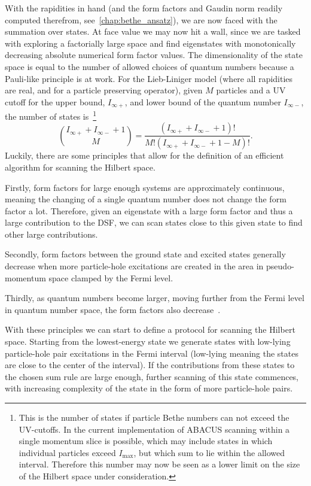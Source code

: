 \documentclass[11pt, a4paper]{report} %
\begin{document}
With the rapidities in hand (and the form factors and Gaudin norm readily computed therefrom, see~\cref{chap:bethe_ansatz}), we are now faced with the summation over states.
At face value we may now hit a wall, since we are tasked with exploring a factorially large space and find eigenstates with monotonically decreasing absolute numerical form factor values.
The dimensionality of the state space is equal to the number of allowed choices of quantum numbers because a Pauli-like principle is at work.
For the Lieb-Liniger model (where all rapidities are real, and for a particle preserving operator), given $M$ particles and a UV cutoff for the upper bound, $I_{\infty+}$, and lower bound of the quantum number $I_{\infty-}$, the number of states is~\cite{Caux2009}\footnote{This is the number of states if particle Bethe numbers can not exceed the UV-cutoffs. In the current implementation of ABACUS scanning within a single momentum slice is possible, which may include states in which individual particles exceed \(I_{\max}\), but which sum to lie within the allowed interval. Therefore this number may now be seen as a lower limit on the size of the Hilbert space under consideration.}
\begin{equation}
  \binom{I_{\infty+} + I_{\infty-} + 1}{M} = \frac{(I_{\infty+} + I_{\infty-} + 1)!}{M!(I_{\infty+} + I_{\infty-} + 1 - M)!}.
\end{equation}
Luckily, there are some principles that allow for the definition of an efficient algorithm for scanning the Hilbert space.

Firstly, form factors for large enough systems are approximately continuous, meaning the changing of a single quantum number does not change the form factor a lot.
Therefore, given an eigenstate with a large form factor and thus a large contribution to the DSF, we can scan states close to this given state to find other large contributions.

Secondly, form factors between the ground state and excited states generally decrease when more particle-hole excitations are created in the area in pseudo-momentum space clamped by the Fermi level.

Thirdly, as quantum numbers become larger, moving further from the Fermi level in quantum number space, the form factors also decrease~\cite{Caux2009}.

With these principles we can start to define a protocol for scanning the Hilbert space.
Starting from the lowest-energy state we generate states with low-lying particle-hole pair excitations in the Fermi interval (low-lying meaning the states are close to the center of the interval).
If the contributions from these states to the chosen sum rule are large enough, further scanning of this state commences, with increasing complexity of the state in the form of more particle-hole pairs.
\end{document}
